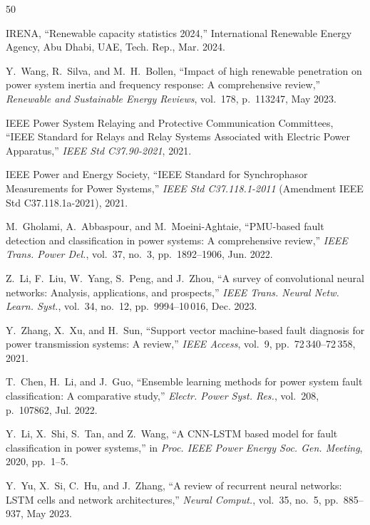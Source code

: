 \documentclass[journal]{IEEEtran}
\begin{document}
\begin{thebibliography}{50}

IRENA, ``Renewable capacity statistics 2024,'' International Renewable Energy Agency, Abu Dhabi, UAE, Tech. Rep., Mar. 2024.

Y.~Wang, R.~Silva, and M.~H.~Bollen, ``Impact of high renewable penetration on power system inertia and frequency response: A comprehensive review,'' \textit{Renewable and Sustainable Energy Reviews}, vol.~178, p.~113247, May 2023.

IEEE Power System Relaying and Protective Communication Committees, ``IEEE Standard for Relays and Relay Systems Associated with Electric Power Apparatus,'' \textit{IEEE Std C37.90-2021}, 2021.

IEEE Power and Energy Society, ``IEEE Standard for Synchrophasor Measurements for Power Systems,'' \textit{IEEE Std C37.118.1-2011} (Amendment IEEE Std C37.118.1a-2021), 2021.

M.~Gholami, A.~Abbaspour, and M.~Moeini-Aghtaie, ``PMU-based fault detection and classification in power systems: A comprehensive review,'' \textit{IEEE Trans. Power Del.}, vol.~37, no.~3, pp.~1892--1906, Jun. 2022.

Z.~Li, F.~Liu, W.~Yang, S.~Peng, and J.~Zhou, ``A survey of convolutional neural networks: Analysis, applications, and prospects,'' \textit{IEEE Trans. Neural Netw. Learn. Syst.}, vol.~34, no.~12, pp.~9994--10\,016, Dec. 2023.

Y.~Zhang, X.~Xu, and H.~Sun, ``Support vector machine-based fault diagnosis for power transmission systems: A review,'' \textit{IEEE Access}, vol.~9, pp.~72\,340--72\,358, 2021.

T.~Chen, H.~Li, and J.~Guo, ``Ensemble learning methods for power system fault classification: A comparative study,'' \textit{Electr. Power Syst. Res.}, vol.~208, p.~107862, Jul. 2022.

Y.~Li, X.~Shi, S.~Tan, and Z.~Wang, ``A CNN-LSTM based model for fault classification in power systems,'' in \textit{Proc. IEEE Power Energy Soc. Gen. Meeting}, 2020, pp.~1--5.

Y.~Yu, X.~Si, C.~Hu, and J.~Zhang, ``A review of recurrent neural networks: LSTM cells and network architectures,'' \textit{Neural Comput.}, vol.~35, no.~5, pp.~885--937, May 2023.


\end{thebibliography}
\end{document}
